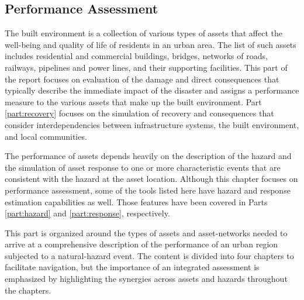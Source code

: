
\begin{partbacktext}
\part{Performance Assessment}\label{part:Performance}

The built environment is a collection of various types of assets that affect the well-being and quality of life of residents in an urban area. The list of such assets includes residential and commercial buildings, bridges, networks of roads, railways, pipelines and power lines, and their supporting facilities. This part of the report focuses on evaluation of the damage and direct consequences that typically describe the immediate impact of the disaster and assigns a performance measure to the various assets that make up the built environment. Part \ref{part:recovery} focuses on the simulation of recovery and consequences that consider interdependencies between infrastructure systems, the built environment, and local communities.

The performance of assets depends heavily on the description of the hazard and the simulation of asset response to one or more characteristic events that are consistent with the hazard at the asset location. Although this chapter focuses on performance assessment, some of the tools listed here have hazard and response estimation capabilities as well. Those features have been covered in Parts \ref{part:hazard} and \ref{part:response}, respectively. 

This part is organized around the types of assets and asset-networks needed to arrive at a comprehensive description of the performance of an urban region subjected to a natural-hazard event. The content is divided into four chapters to facilitate navigation, but the importance of an integrated assessment is emphasized by highlighting the synergies across assets and hazards throughout the chapters.

\end{partbacktext}
